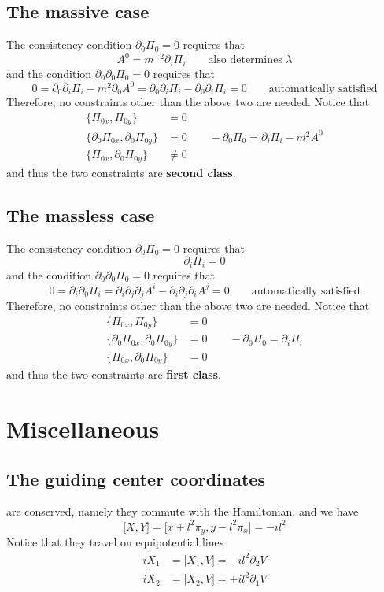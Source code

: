 \documentclass[12pt, oneside]{book}
\begin{document}
\section*{The massive case}
The consistency condition $\partial_0\Pi_0=0$ requires that
\[
A^0=m^{-2}\partial_i\Pi_i\qquad
\text{also determines $\lambda$}
\]
and the condition $\partial_0\partial_0\Pi_0=0$ requires that
\[
0=\partial_0\partial_i\Pi_i-m^2\partial_0A^0=\partial_0\partial_i\Pi_i-\partial_0\partial_i\Pi_i=0\qquad
\text{automatically satisfied}
\]
Therefore, no constraints other than the above two are needed. Notice that
\begin{align*}
\big\{\Pi_{0x},\Pi_{0y}\big\}&=0\\
\big\{\partial_0\Pi_{0x},\partial_0\Pi_{0y}\big\}&=0\qquad
{-}\partial_0\Pi_0=\partial_i\Pi_i-m^2A^0\\
\big\{\Pi_{0x},\partial_0\Pi_{0y}\big\}&\ne0
\end{align*}
and thus the two constraints are \textbf{second class}.

\section*{The massless case}
The consistency condition $\partial_0\Pi_0=0$ requires that
\[
\partial_i\Pi_i=0
\]
and the condition $\partial_0\partial_0\Pi_0=0$ requires that
\[
0=\partial_i\partial_0\Pi_i=\partial_i\partial_j\partial_jA^i-\partial_i\partial_j\partial_iA^j=0\qquad
\text{automatically satisfied}
\]
Therefore, no constraints other than the above two are needed. Notice that
\begin{align*}
\big\{\Pi_{0x},\Pi_{0y}\big\}&=0\\
\big\{\partial_0\Pi_{0x},\partial_0\Pi_{0y}\big\}&=0\qquad
{-}\partial_0\Pi_0=\partial_i\Pi_i\\
\big\{\Pi_{0x},\partial_0\Pi_{0y}\big\}&=0
\end{align*}
and thus the two constraints are \textbf{first class}.

\chapter{Miscellaneous}
\section*{The guiding center coordinates}
are conserved, namely they commute with the Hamiltonian, and we have
\[
\big[X,Y\big]=\big[x+l^2\pi_y,y-l^2\pi_x\big]=-il^2
\]
Notice that they travel on equipotential lines
\begin{align*}
i\dot{X}_1&=\big[X_1,V\big]=-il^2\partial_2V\\
i\dot{X}_2&=\big[X_2,V\big]=+il^2\partial_1V
\end{align*}
\end{document}
